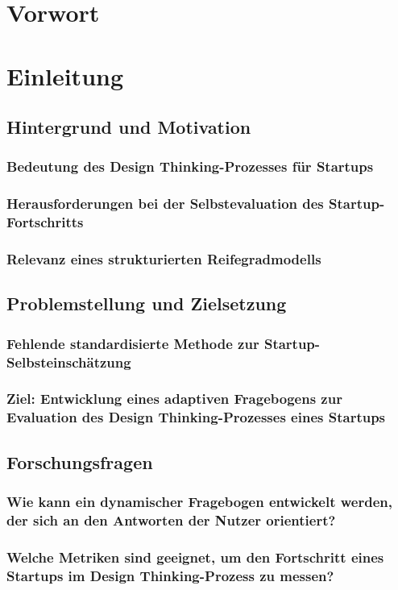 \thispagestyle{fancy}
\chapter{Vorwort}
\chapter{Einleitung}
\section{Hintergrund und Motivation}
\subsection{Bedeutung des Design Thinking-Prozesses für Startups}
\subsection{Herausforderungen bei der Selbstevaluation des Startup-Fortschritts}
\subsection{Relevanz eines strukturierten Reifegradmodells}

\section{Problemstellung und Zielsetzung}
\subsection{Fehlende standardisierte Methode zur Startup-Selbsteinschätzung}
\subsection{Ziel: Entwicklung eines adaptiven Fragebogens zur Evaluation des Design Thinking-Prozesses eines Startups}

\section{Forschungsfragen}
\subsection{Wie kann ein dynamischer Fragebogen entwickelt werden, der sich an den Antworten der Nutzer orientiert?}
\subsection{Welche Metriken sind geeignet, um den Fortschritt eines Startups im Design Thinking-Prozess zu messen?}

